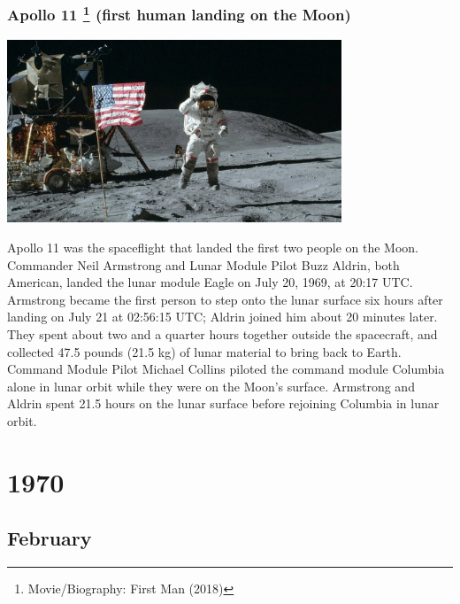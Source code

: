 \documentclass[11pt]{report}
\begin{document}
\subsection{Apollo 11 \protect\footnote{Movie/Biography: First Man (2018)} (first human landing on the Moon)}
\vspace{2mm}\begin{center}\includegraphics[width=10cm]{./img/apollo11.jpg}\end{center}
Apollo 11 was the spaceflight that landed the first two people on the Moon. Commander Neil Armstrong and Lunar Module Pilot Buzz Aldrin, both American, landed the lunar module Eagle on July 20, 1969, at 20:17 UTC. Armstrong became the first person to step onto the lunar surface six hours after landing on July 21 at 02:56:15 UTC; Aldrin joined him about 20 minutes later. They spent about two and a quarter hours together outside the spacecraft, and collected 47.5 pounds (21.5 kg) of lunar material to bring back to Earth. Command Module Pilot Michael Collins piloted the command module Columbia alone in lunar orbit while they were on the Moon's surface. Armstrong and Aldrin spent 21.5 hours on the lunar surface before rejoining Columbia in lunar orbit.

\chapter{1970}
\section{February}
\end{document}
